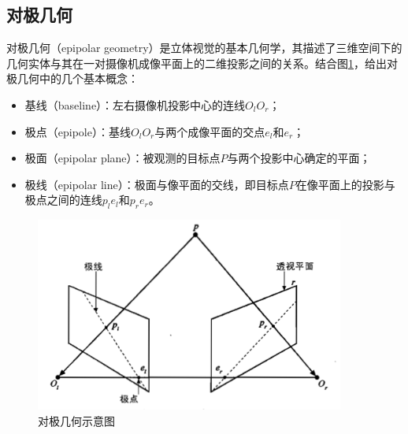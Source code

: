 \subsection{对极几何}


对极几何（epipolar geometry）是立体视觉的基本几何学，其描述了三维空间下的几何实体与其在一对摄像机成像平面上的二维投影之间的关系\cite{kowalczuk2015robust}。结合图\ref{fig:2_3_epipolar_geometry}，给出对极几何中的几个基本概念：

\begin{itemize}
	\item 基线（baseline）：左右摄像机投影中心的连线$O_lO_r$；
	\item 极点（epipole）：基线$O_lO_r$与两个成像平面的交点$e_l$和$e_r$；
	\item 极面（epipolar plane）：被观测的目标点$P$与两个投影中心确定的平面；
	\item 极线（epipolar line）：极面与像平面的交线，即目标点$P$在像平面上的投影与极点之间的连线$p_l e_l$和$p_r e_r$。
\end{itemize}

\begin{figure}[!htb] %
	\centering
	\includegraphics[width=4in]{figures/2_3_epipolar_geometry}
	\caption{对极几何示意图}\label{fig:2_3_epipolar_geometry}
\end{figure}

